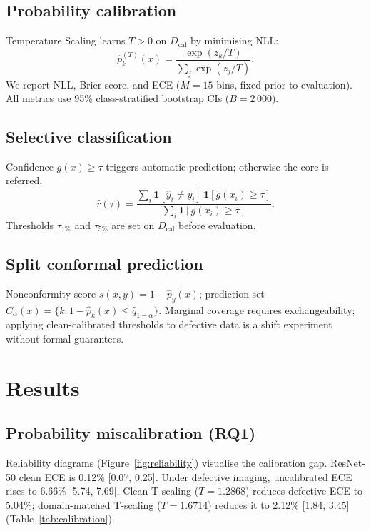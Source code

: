 \documentclass[5p,times,twocolumn]{elsarticle}
\begin{document}
\subsection{Probability calibration}

Temperature Scaling learns $T{>}0$ on $D_{\text{cal}}$ by minimising NLL:
\[
  \hat{p}_k^{(T)}(x) = \frac{\exp(z_k/T)}{\displaystyle\sum_{j}\exp(z_j/T)}.
\]
We report NLL, Brier score, and ECE ($M{=}15$ bins, fixed prior to evaluation).
All metrics use 95\% class-stratified bootstrap CIs ($B{=}2\,000$).

\subsection{Selective classification}

Confidence $g(x){\geq}\tau$ triggers automatic prediction; otherwise the core is referred.
\[
  \hat{r}(\tau) = \frac{\sum_i \mathbf{1}[\hat{y}_i\neq y_i]\,
                        \mathbf{1}[g(x_i)\geq\tau]}
                       {\sum_i \mathbf{1}[g(x_i)\geq\tau]}.
\]
Thresholds $\tau_{1\%}$ and $\tau_{5\%}$ are set on $D_{\text{cal}}$ before evaluation.

\subsection{Split conformal prediction}

Nonconformity score $s(x,y){=}1{-}\hat{p}_y(x)$; prediction set
$C_\alpha(x){=}\{k:1{-}\hat{p}_k(x)\leq\hat{q}_{1-\alpha}\}$.
Marginal coverage requires exchangeability; applying clean-calibrated thresholds to
defective data is a shift experiment without formal guarantees.

\section{Results}
\label{sec:results}

\subsection{Probability miscalibration (RQ1)}

Reliability diagrams (Figure~\ref{fig:reliability}) visualise the calibration gap.
ResNet-50 clean ECE is 0.12\% [0.07, 0.25].
Under defective imaging, uncalibrated ECE rises to 6.66\% [5.74, 7.69].
Clean T-scaling ($T{=}1.2868$) reduces defective ECE to 5.04\%;
domain-matched T-scaling ($T{=}1.6714$) reduces it to 2.12\% [1.84, 3.45]
(Table~\ref{tab:calibration}).
\end{document}
